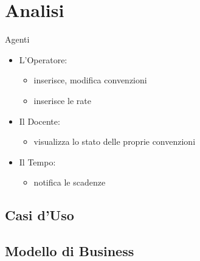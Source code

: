 \section{Analisi}
  \begin{frame}{Agenti}
    
    \begin{itemize}
     \item L'Operatore:\\
      \begin{itemize}
       \item inserisce, modifica convenzioni
       \item inserisce le rate
      \end{itemize}

     \item Il Docente:\\
      \begin{itemize}
       \item visualizza lo stato delle proprie convenzioni
      \end{itemize}

     \item Il Tempo:\\
      \begin{itemize}
       \item notifica le scadenze
      \end{itemize}

    \end{itemize}

    
  \end{frame}

  \subsection{Casi d'Uso}
  
  \subsection{Modello di Business}



